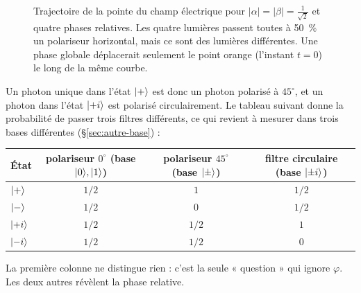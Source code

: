 \begin{figure}[htbp]
\centering
{}
\caption{Trajectoire de la pointe du champ électrique pour $|\alpha|=|\beta|=\frac1{\sqrt2}$ et quatre phases relatives. Les quatre lumières passent toutes à 50~\% un polariseur horizontal, mais ce sont des lumières différentes. Une phase globale déplacerait seulement le point orange (l'instant $t=0$) le long de la même courbe.}\label{fig:jones}
\end{figure}

Un photon unique dans l'état $\lvert +\rangle$ est donc un photon polarisé à $45^\circ$, et un photon dans l'état $\lvert +i\rangle$ est polarisé circulairement. Le tableau suivant donne la probabilité de passer trois filtres différents, ce qui revient à mesurer dans trois bases différentes (§\ref{sec:autre-base}) :
\begin{center}
\begin{tabular}{lccc}
\toprule
État & polariseur $0^\circ$ (base $\lvert 0\rangle,\lvert 1\rangle$) & polariseur $45^\circ$ (base $\lvert \pm\rangle$) & filtre circulaire (base $\lvert \pm i\rangle$) \\
\midrule
$\lvert +\rangle$ & $1/2$ & $1$ & $1/2$ \\
$\lvert -\rangle$ & $1/2$ & $0$ & $1/2$ \\
$\lvert +i\rangle$ & $1/2$ & $1/2$ & $1$ \\
$\lvert -i\rangle$ & $1/2$ & $1/2$ & $0$ \\
\bottomrule
\end{tabular}
\end{center}
La première colonne ne distingue rien : c'est la seule « question » qui ignore $\varphi$. Les deux autres révèlent la phase relative.

